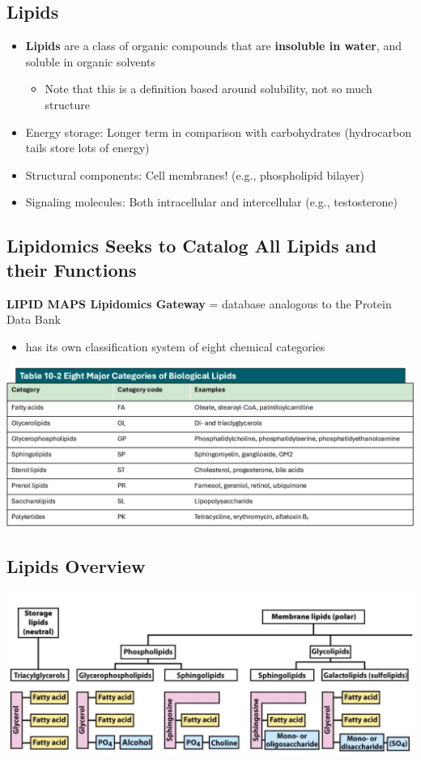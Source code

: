 \documentclass[10pt]{article}
\begin{document}
\subsection*{Lipids}
\begin{itemize}
    \item \textbf{Lipids} are a class of organic compounds that are \textbf{insoluble in water}, and soluble in organic solvents
    \begin{itemize}
        \item Note that this is a definition based around solubility, not so much structure
    \end{itemize}
    \item Energy storage: Longer term in comparison with carbohydrates  (hydrocarbon tails store lots of energy)
    \item Structural components: Cell membranes!  (e.g., phospholipid bilayer)
    \item Signaling molecules: Both intracellular and intercellular  (e.g., testosterone)
\end{itemize}

\subsection*{Lipidomics Seeks to Catalog All Lipids and their Functions}
\textbf{LIPID MAPS Lipidomics Gateway} = database analogous to the Protein Data Bank
\begin{itemize}
    \item has its own classification system of eight chemical categories
\end{itemize}
\begin{center}
    \includegraphics*[width=\textwidth]{L2_2.png}
\end{center}

\subsection*{Lipids Overview}
\begin{center}
    \includegraphics*[width=\textwidth]{L2_3.png}
\end{center}
\end{document}
